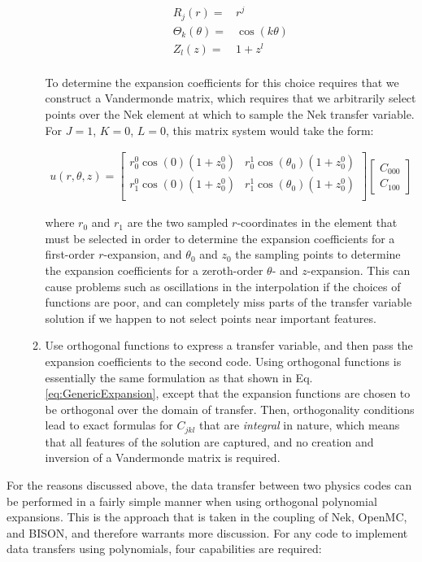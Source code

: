 \documentclass[10pt]{article}
\newcommand{\beqa}{\begin{equation}\begin{aligned}}
\newcommand{\eeqa}{\end{aligned}\end{equation}}
\numberwithin{equation}{section} %
\begin{document}
\begin{enumerate}
\begin{enumerate}
	\beqa
	R_j(r)=&r^j\\
	\Theta_k(\theta)=&\cos(k\theta)\\
	Z_l(z)=&1+z^l\\
	\eeqa

To determine the expansion coefficients for this choice requires that we construct a Vandermonde matrix, which requires that we arbitrarily select points over the Nek element at which to sample the Nek transfer variable. For \(J=1\), \(K=0\), \(L=0\), this matrix system would take the form:

\beqa
u(r,\theta,z)=\begin{bmatrix}
r_0^0\cos{(0)}(1+z_0^0) & r_0^1\cos{(\theta_0)}(1+z_0^0)\\
r_1^0\cos{(0)}(1+z_0^0) & r_1^1\cos{(\theta_0)}(1+z_0^0)\\
\end{bmatrix}
\begin{bmatrix}
C_{000}\\C_{100}
\end{bmatrix}
\eeqa

where \(r_0\) and \(r_1\) are the two sampled \(r\)-coordinates in the element that must be selected in order to determine the expansion coefficients for a first-order \(r\)-expansion, and \(\theta_0\) and \(z_0\) the sampling points to determine the expansion coefficients for a zeroth-order \(\theta\)- and \(z\)-expansion. This can cause problems such as oscillations in the interpolation if the choices of functions are poor, and can completely miss parts of the transfer variable solution if we happen to not select points near important features.

	\item Use orthogonal functions to express a transfer variable, and then pass the expansion coefficients to the second code. Using orthogonal functions is essentially the same formulation as that shown in Eq. \eqref{eq:GenericExpansion}, except that the expansion functions are chosen to be orthogonal over the domain of transfer. Then, orthogonality conditions lead to exact formulas for \(C_{jkl}\) that are {\it integral} in nature, which means that all features of the solution are captured, and no creation and inversion of a Vandermonde matrix is required. 
	\end{enumerate}
	
\end{enumerate}

For the reasons discussed above, the data transfer between two physics codes can be performed in a fairly simple manner when using orthogonal polynomial expansions. This is the approach that is taken in the coupling of Nek, OpenMC, and BISON, and therefore warrants more discussion. For any code to implement data transfers using polynomials, four capabilities are required:
\end{document}
